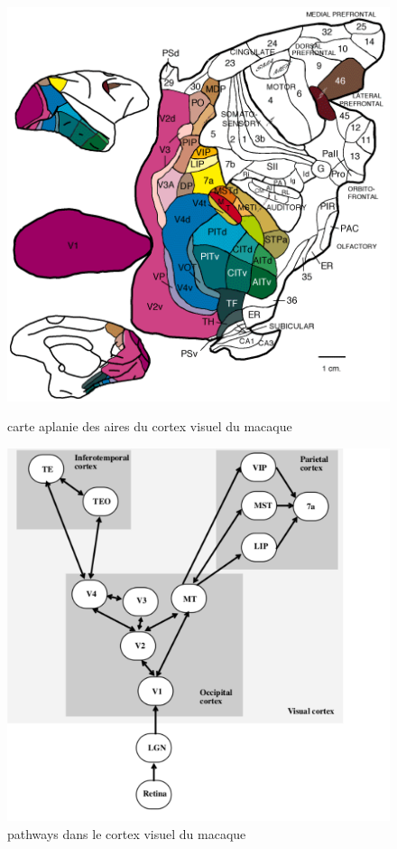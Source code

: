 \begin{figure}
\begin{minipage}{0.48\textwidth}
\centering
\includegraphics[width=\textwidth]{FVE_fig2map.png}
\caption{carte aplanie des aires du cortex visuel du macaque \cite{primate_cortex_91}}
\label{fig:cortex1}
\end{minipage}
\begin{minipage}{0.48\textwidth}
\centering
\includegraphics[width=\textwidth]{rolls_pathways.pdf}
\caption{pathways dans le cortex visuel du macaque \cite{Rolls2002ComputationalNO}}
\label{fig:cortex2}
\end{minipage}
\end{figure}



